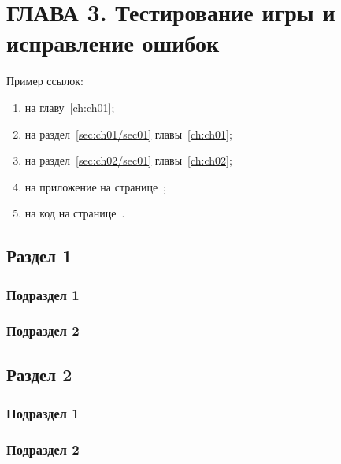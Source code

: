 \chapter{\label{ch:ch03}ГЛАВА 3. Тестирование игры и исправление ошибок}

Пример ссылок:
\begin{enumerate}
\item на главу~\ref{ch:ch01};
\item на раздел~\ref{sec:ch01/sec01} главы~\ref{ch:ch01};
\item на раздел~\ref{sec:ch02/sec01} главы~\ref{ch:ch02};
\item на приложение на странице~\pageref{appendix1};
\item на код на странице~\pageref{code:pi-example}.
\end{enumerate}

\section{\label{sec:ch03/sec01}Раздел 1}

\subsection{\label{subsec:ch03/sec01/sub01}Подраздел 1}

\subsection{\label{subsec:ch03/sec01/sub02}Подраздел 2}

\section{\label{sec:ch03/sec02}Раздел 2}

\subsection{\label{subsec:ch03/sec02/sub01}Подраздел 1}

\subsection{\label{subsec:ch03/sec02/sub02}Подраздел 2}

